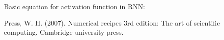 \documentclass[11pt,onecolumn]{article}
\begin{document}
Basic equation for activation function in RNN: 







\begin{thebibliography}{}

  Press, W. H. (2007). Numerical recipes 3rd edition: The art of scientific computing. Cambridge university press.



\end{thebibliography}
\end{document}
